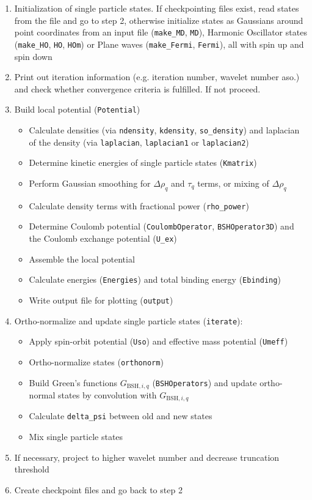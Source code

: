 \documentclass[3p]{elsarticle}
\begin{document}
\begin{enumerate}
\item Initialization of single particle states. If checkpointing files exist, read states from the file and go to step 2, otherwise initialize states as Gaussians around point coordinates from an input file (\texttt{make\_MD}, \texttt{MD}), Harmonic Oscillator states (\texttt{make\_HO}, \texttt{HO}, \texttt{HOm}) or Plane waves (\texttt{make\_Fermi}, \texttt{Fermi}), all with spin up and spin down	
\item Print out iteration information (e.g. iteration number, wavelet number aso.) and check whether convergence criteria is fulfilled. If not proceed. 
\item Build local potential (\texttt{Potential})
	\begin{itemize}
		\item Calculate densities (via \texttt{ndensity}, \texttt{kdensity}, \texttt{so\_density}) and laplacian of the density (via \texttt{laplacian}, \texttt{laplacian1} or  \texttt{laplacian2})
		\item Determine kinetic energies of single particle states (\texttt{Kmatrix})
		\item Perform Gaussian smoothing for $\Delta \rho_q$ and $\tau_q$ terms, or mixing of $\Delta \rho_q$
		\item Calculate density terms with fractional power (\texttt{rho\_power})
		\item Determine Coulomb potential (\texttt{CoulombOperator}, \texttt{BSHOperator3D}) and the Coulomb exchange potential (\texttt{U\_ex}) 
		\item Assemble the local potential
		\item Calculate energies (\texttt{Energies}) and total binding energy (\texttt{Ebinding}) 
		\item Write output file for plotting (\texttt{output})
	\end{itemize}
\item Ortho-normalize and update single particle states (\texttt{iterate}):	
	\begin{itemize}
		\item Apply spin-orbit potential (\texttt{Uso}) and effective mass potential (\texttt{Umeff}) 
		\item Ortho-normalize states (\texttt{orthonorm}) 
		\item Build Green's functions $G_{\mathrm{BSH},i,q}$ (\texttt{BSHOperators}) and update ortho-normal states by convolution with $G_{\mathrm{BSH},i,q}$
		\item Calculate \texttt{delta\_psi} between old and new states
		\item Mix single particle states 
	\end{itemize}
\item If necessary, project to higher wavelet number and decrease truncation threshold
\item Create checkpoint files and go back to step 2
\end{enumerate} 
\end{document}
